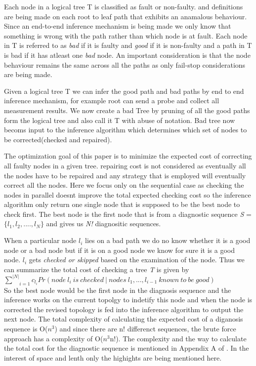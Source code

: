 \documentclass[10pt]{sigplan-proc-varsize}
\begin{document}
Each node in a logical tree T is classified as fault or non-faulty. and definitions are being made on each root to leaf path that exhibits an anamalous behaviour. Since an end-to-end inference mechanism is being made we only know that something is wrong with the path rather than which node is at fault. Each node in T is referred to as {\it bad} if it is faulty and {\it good} if it is non-faulty and a path in T is bad if it has atleast one {\it bad} node. An important consideration is that the node behaviour remains the same across all the paths as only fail-stop considerations are being made. 

Given a logical tree T we can infer the good path and bad paths by end to end inference mechanism, for example root can send a probe and collect all measurement results. We now create a bad Tree by pruning of all the good paths form the logical tree and also call it T with abuse of notation. Bad tree now becoms input to the inference algorithm which determines which set of nodes to be corrected(checked and repaired).

The optimization goal of this paper is to minimize the expected cost of correcting all faulty nodes in a given tree. repairing cost is not considered as eventually all the nodes have to be repaired and any strategy that is employed will eventually correct all the nodes. Here we focus only on the sequential case as checking the nodes in parallel doesnt improve the total expected checking cost so the inference algorithm only return one single node that is supposed to be the best node to check first. The best node is the first node that is from a diagnostic sequence {\it S} = $\{l_1,l_2,....,l_N\}$ and gives us {\it N!} diagnositic sequences.

When a particular node {\it $l_i$} lies on a bad path we do no know whether it is a good node or a bad node but if it is on a good node we know for sure it is a good node. {\it $l_i$}  gets {\it checked or skipped} based on the examination of the node. Thus we can summarize the total cost of checking a tree {\it T} is given by  \\
$\underset{i=1}{\overset{|N|}{\sum}} c_{l_i} Pr(node\ l_i\ is\ checked\ | \ nodes\ l_1,...,l_{i-1}\ known\ to\ be\ good)$ \\
So the best node would be the first node in the diagnosis sequence and the inference works on the current topolgy to indetify this node and when the node is corrected the revised topology is fed into the inference algorithm to output the next node. The total complexity of calculating the expected cost of a diganosis sequence is O($n^3$) and since there are n! differenct sequences, the brute force approach has a complexity of O($n^3$n!). The complexity and the way to calculate the total cost for the diagnostic sequence is mentioned in Appendix A of \cite{pclee:07}. In the interest of space and lenth only the highights are being mentioned here.
\end{document}
